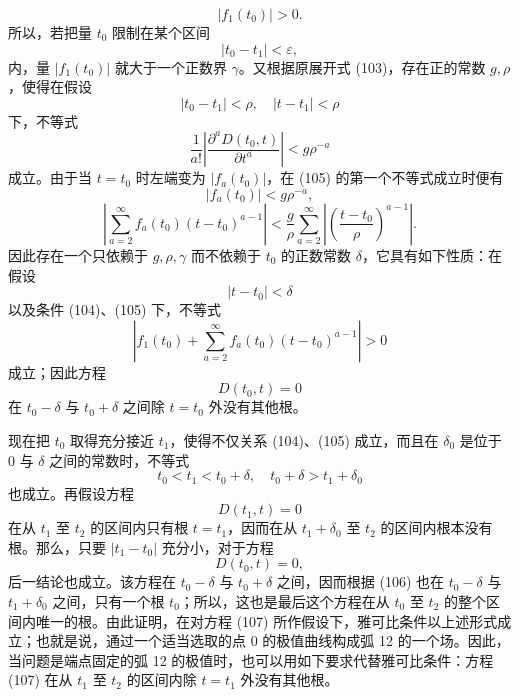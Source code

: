 \documentclass[11pt,a4paper,leqno]{article}
\begin{document}
\[
|f_1(t_0)|>0.
\]
所以，若把量 $t_0$ 限制在某个区间
\begin{equation}\tag{104}
|t_0-t_1|<\varepsilon,
\end{equation}
内，量 $|f_1(t_0)|$ 就大于一个正数界 $\gamma$。又根据原展开式 (103)，存在正的常数 $g,\rho$，使得在假设
\begin{equation}\tag{105}
|t_0-t_1|<\rho,
\quad
|t-t_1|<\rho
\end{equation}
下，不等式
\[
\frac1{a!}\left|\frac{\partial^aD(t_0,t)}{\partial t^a}\right|<g\rho^{-a}
\]
成立。由于当 $t=t_0$ 时左端变为 $|f_a(t_0)|$，在 (105) 的第一个不等式成立时便有
\[
|f_a(t_0)|<g\rho^{-a},
\]
\[
\left|\sum_{a=2}^{\infty}f_a(t_0)(t-t_0)^{a-1}\right|
<\frac{g}{\rho}\sum_{a=2}^{\infty}\left|\left(\frac{t-t_0}{\rho}\right)^{a-1}\right|.
\]
因此存在一个只依赖于 $g,\rho,\gamma$ 而不依赖于 $t_0$ 的正数常数 $\delta$，它具有如下性质：在假设
\[
|t-t_0|<\delta
\]
以及条件 (104)、(105) 下，不等式
\[
\left|f_1(t_0)+\sum_{a=2}^{\infty}f_a(t_0)(t-t_0)^{a-1}\right|>0
\]
成立；因此方程
\[
D(t_0,t)=0
\]
在 $t_0-\delta$ 与 $t_0+\delta$ 之间除 $t=t_0$ 外没有其他根。

现在把 $t_0$ 取得充分接近 $t_1$，使得不仅关系 (104)、(105) 成立，而且在 $\delta_0$ 是位于 0 与 $\delta$ 之间的常数时，不等式
\begin{equation}\tag{106}
t_0<t_1<t_0+\delta,
\quad
t_0+\delta>t_1+\delta_0
\end{equation}
也成立。再假设方程
\begin{equation}\tag{107}
D(t_1,t)=0
\end{equation}
在从 $t_1$ 至 $t_2$ 的区间内只有根 $t=t_1$，因而在从 $t_1+\delta_0$ 至 $t_2$ 的区间内根本没有根。那么，只要 $|t_1-t_0|$ 充分小，对于方程
\[
D(t_0,t)=0,
\]
后一结论也成立。该方程在 $t_0-\delta$ 与 $t_0+\delta$ 之间，因而根据 (106) 也在 $t_0-\delta$ 与 $t_1+\delta_0$ 之间，只有一个根 $t_0$；所以，这也是最后这个方程在从 $t_0$ 至 $t_2$ 的整个区间内唯一的根。由此证明，在对方程 (107) 所作假设下，雅可比条件以上述形式成立；也就是说，通过一个适当选取的点 0 的极值曲线构成弧 12 的一个场。因此，当问题是端点固定的弧 12 的极值时，也可以用如下要求代替雅可比条件：方程 (107) 在从 $t_1$ 至 $t_2$ 的区间内除 $t=t_1$ 外没有其他根。
\end{document}
